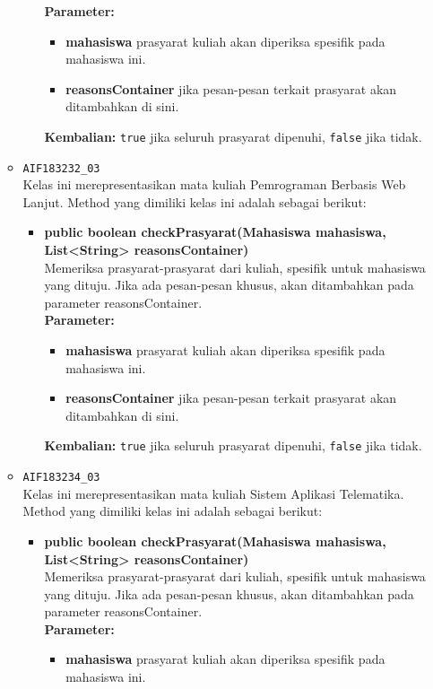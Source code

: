 \begin{enumerate}
\begin{itemize}
\begin{itemize}
			\textbf{Parameter:}
			\begin{itemize}
				\item \textbf{mahasiswa} prasyarat kuliah akan diperiksa spesifik pada mahasiswa ini.
				\item \textbf{reasonsContainer} jika pesan-pesan terkait prasyarat akan ditambahkan di sini.
			\end{itemize}
			\textbf{Kembalian:} \texttt{true} jika seluruh prasyarat dipenuhi, \texttt{false} jika tidak.
		\end{itemize}
		\item \texttt{AIF183232\_03} \\
		Kelas ini merepresentasikan mata kuliah Pemrograman Berbasis Web Lanjut. Method yang dimiliki kelas ini adalah sebagai berikut: 
		\begin{itemize}
			\item \textbf{public boolean checkPrasyarat(Mahasiswa mahasiswa, List<String> reasonsContainer)}\\
			Memeriksa prasyarat-prasyarat dari kuliah, spesifik untuk mahasiswa yang dituju. Jika ada pesan-pesan khusus, akan ditambahkan pada parameter reasonsContainer.\\
			\textbf{Parameter:}
			\begin{itemize}
				\item \textbf{mahasiswa} prasyarat kuliah akan diperiksa spesifik pada mahasiswa ini.
				\item \textbf{reasonsContainer} jika pesan-pesan terkait prasyarat akan ditambahkan di sini.
			\end{itemize}
			\textbf{Kembalian:} \texttt{true} jika seluruh prasyarat dipenuhi, \texttt{false} jika tidak.
		\end{itemize}
		\item \texttt{AIF183234\_03} \\
		Kelas ini merepresentasikan mata kuliah Sistem Aplikasi Telematika. Method yang dimiliki kelas ini adalah sebagai berikut: 
		\begin{itemize}
			\item \textbf{public boolean checkPrasyarat(Mahasiswa mahasiswa, List<String> reasonsContainer)}\\
			Memeriksa prasyarat-prasyarat dari kuliah, spesifik untuk mahasiswa yang dituju. Jika ada pesan-pesan khusus, akan ditambahkan pada parameter reasonsContainer.\\
			\textbf{Parameter:}
			\begin{itemize}
				\item \textbf{mahasiswa} prasyarat kuliah akan diperiksa spesifik pada mahasiswa ini.

\end{itemize}
\end{itemize}
\end{itemize}
\end{enumerate}
